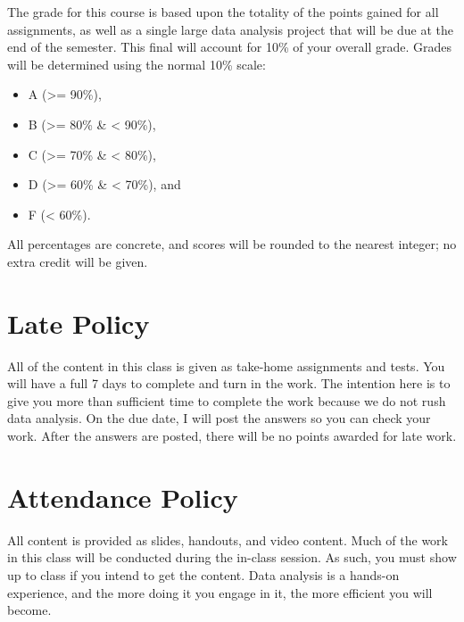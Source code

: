 \documentclass[
  letterpaper,
]{book}
\providecommand{\tightlist}{%
  \setlength{\itemsep}{0pt}\setlength{\parskip}{0pt}}
\begin{document}

The grade for this course is based upon the totality of the points
gained for all assignments, as well as a single large data analysis
project that will be due at the end of the semester. This final will
account for 10\% of your overall grade. Grades will be determined using
the normal 10\% scale:

\begin{itemize}
\tightlist
\item
  A (\textgreater= 90\%),\\
\item
  B (\textgreater= 80\% \& \textless{} 90\%),\\
\item
  C (\textgreater= 70\% \& \textless{} 80\%),
\item
  D (\textgreater= 60\% \& \textless{} 70\%), and
\item
  F (\textless{} 60\%).
\end{itemize}

All percentages are concrete, and scores will be rounded to the nearest
integer; no extra credit will be given.

\section*{Late Policy}\label{late-policy}


All of the content in this class is given as take-home assignments and
tests. You will have a full 7 days to complete and turn in the work. The
intention here is to give you more than sufficient time to complete the
work because we do not rush data analysis. On the due date, I will post
the answers so you can check your work. After the answers are posted,
there will be no points awarded for late work.

\section*{Attendance Policy}\label{attendance-policy}


All content is provided as slides, handouts, and video content. Much of
the work in this class will be conducted during the in-class session. As
such, you must show up to class if you intend to get the content. Data
analysis is a hands-on experience, and the more doing it you engage in
it, the more efficient you will become.
\end{document}
